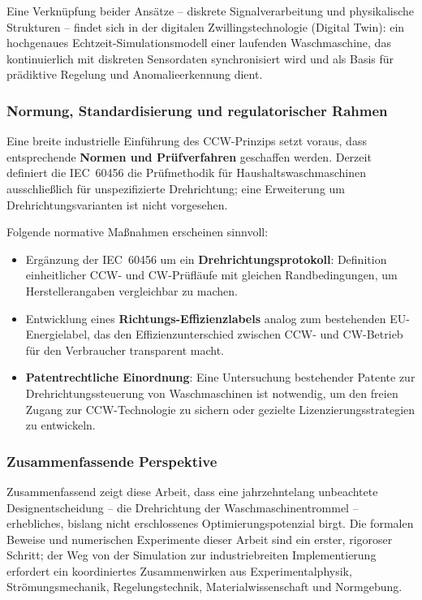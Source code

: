 ﻿\documentclass[12pt,a4paper]{article}
\theoremstyle{remark}
\begin{document}
	Eine Verknüpfung beider Ansätze -- diskrete Signalverarbeitung und physikalische Strukturen
	-- findet sich in der digitalen Zwillingstechnologie (Digital Twin): ein hochgenaues
	Echtzeit-Simulationsmodell einer laufenden Waschmaschine, das kontinuierlich mit
	diskreten Sensordaten synchronisiert wird und als Basis für prädiktive Regelung und
	Anomalieerkennung dient.
	
	\subsubsection{Normung, Standardisierung und regulatorischer Rahmen}
	
	Eine breite industrielle Einführung des CCW-Prinzips setzt voraus, dass entsprechende
	\textbf{Normen und Prüfverfahren} geschaffen werden. Derzeit definiert die
	IEC~60456 die Prüfmethodik für Haushaltswaschmaschinen ausschließlich für unspezifizierte
	Drehrichtung; eine Erweiterung um Drehrichtungsvarianten ist nicht vorgesehen.
	
	Folgende normative Maßnahmen erscheinen sinnvoll:
	\begin{itemize}
		\item Ergänzung der IEC~60456 um ein \textbf{Drehrichtungsprotokoll}: Definition
		einheitlicher CCW- und CW-Prüfläufe mit gleichen Randbedingungen,
		um Herstellerangaben vergleichbar zu machen.
		\item Entwicklung eines \textbf{Richtungs-Effizienzlabels} analog zum bestehenden
		EU-Energie\-label, das den Effizienzunterschied zwischen CCW- und CW-Betrieb für
		den Verbraucher transparent macht.
		\item \textbf{Patentrechtliche Einordnung}: Eine Untersuchung bestehender Patente
		zur Drehrichtungssteuerung von Waschmaschinen ist notwendig, um den freien
		Zugang zur CCW-Technologie zu sichern oder gezielte Lizenzierungsstrategien
		zu entwickeln.
	\end{itemize}
	
	\subsubsection{Zusammenfassende Perspektive}
	
	Zusammenfassend zeigt diese Arbeit, dass eine jahrzehntelang unbeachtete Designentscheidung
	-- die Drehrichtung der Waschmaschinentrommel -- erhebliches, bislang nicht erschlossenes
	Optimierungspotenzial birgt. Die formalen Beweise und numerischen Experimente dieser
	Arbeit sind ein erster, rigoroser Schritt; der Weg von der Simulation zur industrie\-breiten
	Implementierung erfordert ein koordiniertes Zusammenwirken aus Experimentalphysik,
	Strömungsmechanik, Regelungstechnik, Materialwissenschaft und Normgebung.
	
\end{document}
